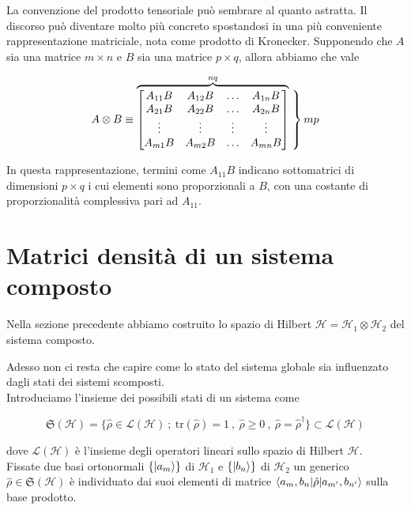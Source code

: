 La convenzione del prodotto tensoriale può sembrare al quanto astratta. Il discorso può diventare molto più concreto spostandosi in una più conveniente rappresentazione matriciale, nota come prodotto di Kronecker. Supponendo che $A$ sia una matrice $m \times n$ e $B$ sia una matrice $p \times q$, allora abbiamo che vale

\begin{equation}
    A \otimes B \equiv
    \overbrace{%
      \begin{bmatrix}
        A_{11}B & A_{12}B & \ldots & A_{1n}B \\
        A_{21}B & A_{22}B & \ldots & A_{2n}B \\
        \vdots  & \vdots  & \vdots & \vdots  \\
        A_{m1}B & A_{m2}B & \ldots & A_{mn}B
      \end{bmatrix}
    }^{nq}
    \left.\vphantom{%
      \begin{bmatrix}
        A_{11}B \\ A_{21}B \\ \vdots \\ A_{m1}B
      \end{bmatrix}
    }\right\} mp
    \label{eq:kronecker}
\end{equation}

In questa rappresentazione, termini come $A_{11}B$ indicano sottomatrici di dimensioni $p \times q$ i cui elementi sono proporzionali a $B$, con una costante di proporzionalità complessiva pari ad $A_{11}$.

\section{Matrici densità di un sistema composto}

Nella sezione precedente abbiamo costruito lo spazio di Hilbert $\mathcal{H} = \mathcal{H}_1 \otimes \mathcal{H}_2$ del sistema composto. 

Adesso non ci resta che capire come lo stato del sistema globale sia influenzato dagli stati dei sistemi scomposti.\\
Introduciamo l'insieme dei possibili stati di un sistema come
%
\begin{tcolorbox}[colback=black!5!white, colframe=black!45!white, boxrule=0.8pt]
\begin{equation}
    \mathfrak{S}(\mathcal{H}) = \{ \hat{\rho} \in \mathcal{L}(\mathcal{H}) \ ; \ \text{tr}(\hat{\rho}) = 1 \ , \ \hat{\rho} \geq 0 \ , \ \hat{\rho} = \hat{\rho}^{\dagger}\} \subset \mathcal{L}(\mathcal{H})
\end{equation}
\end{tcolorbox}
dove $\mathcal{L}(\mathcal{H})$ è l'insieme degli operatori lineari sullo spazio di Hilbert $\mathcal{H}$.\\
Fissate due basi ortonormali $\{ \ket{a_m} \}$ di $\mathcal{H}_1$ e $\{ \ket{b_n} \}$ di $\mathcal{H}_2$ un generico $\hat{\rho} \in \mathfrak{S}(\mathcal{H})$ è individuato dai suoi elementi di matrice $\braket{a_m, b_n|\hat{\rho}|a_{m'}, b_{n'}}$ sulla base prodotto. 

